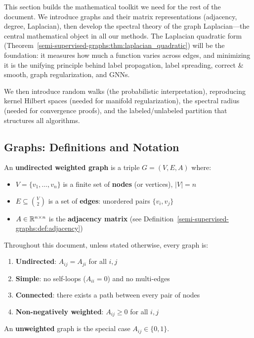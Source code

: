 \begin{notechapter}
This section builds the mathematical toolkit we need for the rest of the
document. We introduce graphs and their matrix representations (adjacency,
degree, Laplacian), then develop the spectral theory of the graph
Laplacian---the central mathematical object in all our methods. The Laplacian
quadratic form (Theorem~\ref{semi-supervised-graphs:thm:laplacian_quadratic}) will be the foundation:
it measures how much a function varies across edges, and minimizing it is the
unifying principle behind label propagation, label spreading, correct \& smooth,
graph regularization, and GNNs.

We then introduce random walks (the probabilistic interpretation), reproducing
kernel Hilbert spaces (needed for manifold regularization), the spectral radius
(needed for convergence proofs), and the labeled/unlabeled partition that
structures all algorithms.

\subsection{Graphs: Definitions and Notation}

\begin{definition}
\label{semi-supervised-graphs:def:graph}
An \textbf{undirected weighted graph} is a triple $G = (V, E, A)$ where:
\begin{itemize}
    \item $V = \{v_1, \ldots, v_n\}$ is a finite set of \textbf{nodes}
      (or vertices), $|V| = n$
    \item $E \subseteq \binom{V}{2}$ is a set of \textbf{edges}: unordered
      pairs $\{v_i, v_j\}$
    \item $A \in \mathbb{R}^{n \times n}$ is the \textbf{adjacency matrix}
      (see Definition~\ref{semi-supervised-graphs:def:adjacency})
\end{itemize}
\end{definition}

\begin{definition}
\label{semi-supervised-graphs:def:standing}
Throughout this document, unless stated otherwise, every graph is:
\begin{enumerate}
    \item \textbf{Undirected}: $A_{ij} = A_{ji}$ for all $i, j$
    \item \textbf{Simple}: no self-loops ($A_{ii} = 0$) and no multi-edges
    \item \textbf{Connected}: there exists a path between every pair of nodes
    \item \textbf{Non-negatively weighted}: $A_{ij} \geq 0$ for all $i, j$
\end{enumerate}
An \textbf{unweighted} graph is the special case $A_{ij} \in \{0, 1\}$.
\end{definition}


\end{notechapter}
